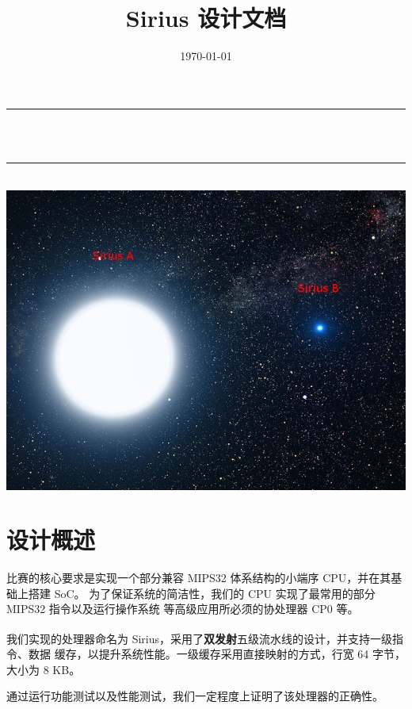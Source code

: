 \documentclass[blue,normal,cn,hide]{elegantbook}
\title{Sirius 设计文档}
\date{\today}
\author{}
\makeatletter
\let\thetitle\@title
\makeatother
\begin{document}
\begin{titlepage}
    \vspace*{\fill}
    \begin{center}
        \rule{\linewidth}{0.2 mm} \\[0.4 cm]
        { \huge \bfseries \thetitle}\\
        \rule{\linewidth}{0.2 mm} \\[1.5 cm]
        \vspace*{2cm}
        \includegraphics[scale = 0.618]{logo.jpg}\\[1.0 cm]
    \end{center}
    \vspace*{\fill}
\end{titlepage}

\tableofcontents
\mainmatter

\chapter{设计概述}

比赛的核心要求是实现一个部分兼容 MIPS32 体系结构的小端序 CPU，并在其基础上搭建 SoC。
为了保证系统的简洁性，我们的 CPU 实现了最常用的部分 MIPS32 指令以及运行操作系统
等高级应用所必须的协处理器 CP0 等。

我们实现的处理器命名为 Sirius，采用了\textbf{双发射}五级流水线的设计\textsuperscript{\cite{Patterson:2013:COD:2568134}}，并支持一级指令、数据
缓存，以提升系统性能。一级缓存采用直接映射的方式，行宽 64 字节，大小为 8 KB。

通过运行功能测试以及性能测试，我们一定程度上证明了该处理器的正确性。
\end{document}
